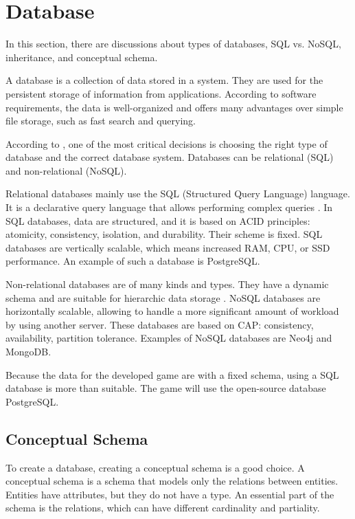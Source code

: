 \section{Database}

In this section, there are discussions about types of databases, SQL vs. NoSQL, inheritance, and conceptual schema.

A database is a collection of data stored in a system.
They are used for the persistent storage of information from applications.
According to software requirements, the data is well-organized and offers many advantages over simple file storage, such as fast search and querying.

According to \cite{a2018_difference_db}, one of the most critical decisions is choosing the right type of database and the correct database system.
Databases can be relational (SQL) and non-relational (NoSQL).

Relational databases mainly use the SQL (Structured Query Language) language.
It is a declarative query language that allows performing complex queries \cite{a2018_difference_db}.
In SQL databases, data are structured, and it is based on ACID principles: atomicity, consistency, isolation, and durability.
Their scheme is fixed.
SQL databases are vertically scalable, which means increased RAM, CPU, or SSD performance.
An example of such a database is PostgreSQL.

Non-relational databases are of many kinds and types.
They have a dynamic schema and are suitable for hierarchic data storage \cite{a2018_difference_db}.
NoSQL databases are horizontally scalable, allowing to handle a more significant amount of workload by using another server.
These databases are based on CAP: consistency, availability, partition tolerance.
Examples of NoSQL databases are Neo4j and MongoDB.

Because the data for the developed game are with a fixed schema, using a SQL database is more than suitable.
The game will use the open-source database PostgreSQL.

\subsection{Conceptual Schema}
\label{design:conceptual}

To create a database, creating a conceptual schema is a good choice.
A conceptual schema is a schema that models only the relations between entities.
Entities have attributes, but they do not have a type.
An essential part of the schema is the relations, which can have different cardinality and partiality.


